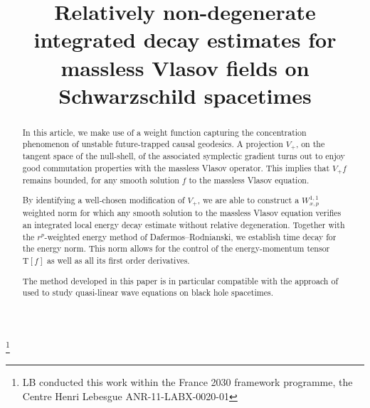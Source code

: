 \documentclass[JEP,XML,SOM,Unicode,published]{cedram}
\theoremstyle{plain}
\theoremstyle{definition}
\begin{document}
\title[Relatively non-degenerate estimates for massless Vlasov on Schwarzschild]{Relatively non-degenerate integrated decay estimates for massless Vlasov fields on Schwarzschild spacetimes}

\author[\initial{L.} \lastname{Bigorgne}]{ }
\address{Univ Rennes, CNRS, IRMAR - UMR 6625\\
F-35000 Rennes, France}

\author[\initial{R.} \lastname{Velozo Ruiz}]{ }
\address{Department of Mathematics, University of Toronto,\\
40 St. George Street, Toronto, ON, Canada}

\thanks{LB conducted this work within the France 2030 framework programme, the Centre Henri Lebesgue ANR-11-LABX-0020-01}

\begin{abstract}
In this article, we make use of a weight function capturing the concentration phenomenon of unstable future-trapped causal geodesics. A projection $V_+$, on the tangent space of the null-shell, of the associated symplectic gradient turns out to enjoy good commutation properties with the massless Vlasov operator. This implies that $V_+f$ remains bounded, for any smooth solution $f$ to the massless Vlasov equation.

By identifying a well-chosen modification of $V_+$, we are able to construct a $W_{x,p}^{1,1}$ weighted norm for which any smooth solution to the massless Vlasov equation verifies an integrated local energy decay estimate without relative degeneration. Together with the $r^p$-weighted energy method of Dafermos--Rodnianski, we establish time decay for the energy norm. This norm allows for the control of the energy-momentum tensor $\mathrm{T}[f]$ as well as all its first order derivatives.

The method developed in this paper is in particular compatible with the approach of \cite{Mavq, DHRTq} used to study quasi-linear wave equations on black hole spacetimes. 
\end{abstract}


\end{document}
